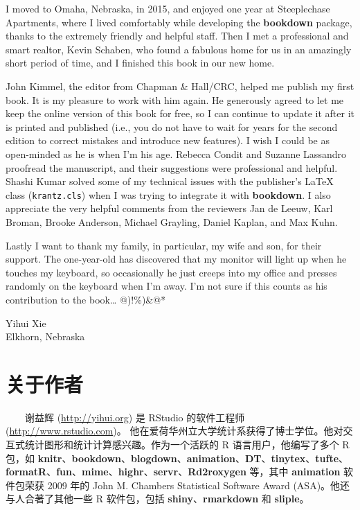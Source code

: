 \documentclass[
  12pt,
]{krantz}
\theoremstyle{definition}
\theoremstyle{definition}
\theoremstyle{definition}
\theoremstyle{definition}
\theoremstyle{remark}
\begin{document}
I moved to Omaha, Nebraska, in 2015, and enjoyed one year at Steeplechase Apartments, where I lived comfortably while developing the \textbf{bookdown} package, thanks to the extremely friendly and helpful staff. Then I met a professional and smart realtor, Kevin Schaben, who found a fabulous home for us in an amazingly short period of time, and I finished this book in our new home.

John Kimmel, the editor from Chapman \& Hall/CRC, helped me publish my first book. It is my pleasure to work with him again. He generously agreed to let me keep the online version of this book for free, so I can continue to update it after it is printed and published (i.e., you do not have to wait for years for the second edition to correct mistakes and introduce new features). I wish I could be as open-minded as he is when I'm his age. Rebecca Condit and Suzanne Lassandro proofread the manuscript, and their suggestions were professional and helpful. Shashi Kumar solved some of my technical issues with the publisher's LaTeX class (\texttt{krantz.cls}) when I was trying to integrate it with \textbf{bookdown}. I also appreciate the very helpful comments from the reviewers Jan de Leeuw, Karl Broman, Brooke Anderson, Michael Grayling, Daniel Kaplan, and Max Kuhn.

Lastly I want to thank my family, in particular, my wife and son, for their support. The one-year-old has discovered that my monitor will light up when he touches my keyboard, so occasionally he just creeps into my office and presses randomly on the keyboard when I'm away. I'm not sure if this counts as his contribution to the book\ldots{} @)!\%)\&@*

\begin{flushright}
Yihui Xie\\
Elkhorn, Nebraska
\end{flushright}

\hypertarget{ux5173ux4e8eux4f5cux8005}{%
\chapter*{关于作者}\label{ux5173ux4e8eux4f5cux8005}}


  谢益辉 (\url{http://yihui.org}) 是 RStudio 的软件工程师 (\url{http://www.rstudio.com})。 他在爱荷华州立大学统计系获得了博士学位。他对交互式统计图形和统计计算感兴趣。作为一个活跃的 R 语言用户，他编写了多个 R 包，如 \textbf{knitr}、\textbf{bookdown}、\textbf{blogdown}、\textbf{animation}、\textbf{DT}、\textbf{tinytex}、\textbf{tufte}、\textbf{formatR}、\textbf{fun}、\textbf{mime}、\textbf{highr}、\textbf{servr}、\textbf{Rd2roxygen} 等，其中 \textbf{animation} 软件包荣获 2009 年的 John M. Chambers Statistical Software Award (ASA)。他还与人合著了其他一些 R 软件包，包括 \textbf{shiny}、\textbf{rmarkdown} 和 \textbf{sliple}。
\end{document}
